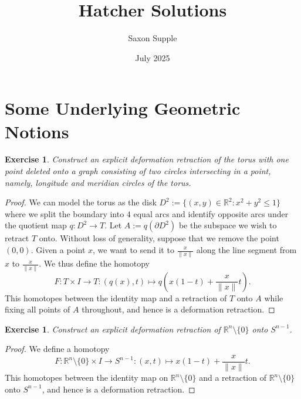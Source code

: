 \documentclass{article}
\title{Hatcher Solutions}
\author{Saxon Supple}
\date{July 2025}
\newtheorem{exercise}[theorem]{Exercise}
\begin{document}
\maketitle
\section{Some Underlying Geometric Notions}
\begin{exercise}
Construct an explicit deformation retraction of the torus with one point deleted onto a graph consisting of two circles intersecting in a point, namely, longitude and meridian circles of the torus.
\end{exercise}
\begin{proof}
We can model the torus as the disk $D^2:=\{(x,y)\in\mathbb{R}^2:x^2+y^2\leq 1\}$ where we split the boundary into $4$ equal arcs and identify opposite arcs under the quotient map $q:D^2\to T$. Let $A:=q(\partial D^2)$ be the subspace we wish to retract $T$ onto. Without loss of generality, suppose that we remove the point $(0,0)$. Given a point $x$, we want to send it to $\frac{x}{\|x\|}$ along the line segment from $x$ to $\frac{x}{\|x\|}$. We thus define the homotopy \[F:T\times I\to T:(q(x),t)\mapsto q\left(x(1-t)+\frac{x}{\|x\|}t\right).\] This homotopes between the identity map and a retraction of $T$ onto $A$ while fixing all points of $A$ throughout, and hence is a deformation retraction.
\end{proof}

\begin{exercise}
Construct an explicit deformation retraction of $\mathbb{R}^n\setminus\{0\}$ onto $S^{n-1}$.
\end{exercise}
\begin{proof}
We define a homotopy \[F:\mathbb{R}^n\setminus\{0\}\times I\to S^{n-1}:(x,t)\mapsto x(1-t)+\frac{x}{\|x\|}t.\] This homotopes between the identity map on $\mathbb{R}^n\setminus\{0\}$ and a retraction of $\mathbb{R}^n\setminus\{0\}$ onto $S^{n-1}$, and hence is a deformation retraction.
\end{proof}
\end{document}
